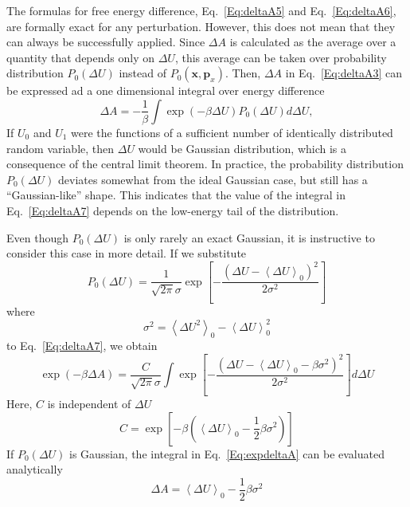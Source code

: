 The formulas for free energy difference, Eq.~\ref{Eq:deltaA5} and Eq.~\ref{Eq:deltaA6}, are formally exact for any perturbation. However, this does not mean that they can always be successfully applied. Since $\Delta A$ is calculated as the average over a quantity that depends only on $\Delta U$, this average can be taken over probability distribution $P_0(\Delta U)$ instead of $P_{0}(\textbf{x},\textbf{p}_{x})$. Then, $\Delta A$ in Eq.~\ref{Eq:deltaA3} can be expressed ad a one dimensional integral over energy difference
\begin{equation}
\Delta A = -\frac{1}{\beta} \int \exp(-\beta \Delta U) P_{0}(\Delta U) d\Delta U,
\label{Eq:deltaA7}
\end{equation}
If $U_{0}$ and $U_{1}$ were the functions of a sufficient number of identically distributed random variable, then $\Delta U$ would be Gaussian distribution, which is a consequence of the central limit theorem. In practice, the probability distribution $P_{0}(\Delta U)$ deviates somewhat from the ideal Gaussian case, but still has a ``Gaussian-like'' shape. This indicates that the value of the integral in Eq.~\ref{Eq:deltaA7} depends on the low-energy tail of the distribution.

Even though $P_{0}(\Delta U)$ is only rarely an exact Gaussian, it is instructive to consider this case in more detail. If we substitute
\begin{equation}
P_{0}(\Delta U) = \frac{1}{\sqrt{2\pi}\sigma}\exp[-\frac{(\Delta U - \left \langle \Delta U \right \rangle_{0})^2}{2\sigma^2}]
\label{Eq:gaussian}
\end{equation}
where
\begin{equation}
\sigma^2 = \left \langle \Delta U^2 \right \rangle_{0} - \left \langle \Delta U \right \rangle_{0}^2
\label{Eq:variance}
\end{equation}
to Eq.~\ref{Eq:deltaA7}, we obtain
\begin{equation}
\exp(-\beta \Delta A) = \frac{C}{\sqrt{2\pi}\sigma} \int \exp[-\frac{(\Delta U - \left \langle \Delta U \right \rangle_{0} - \beta \sigma ^2)^2}{2\sigma^2}] d\Delta U
\label{Eq:expdeltaA}
\end{equation}
Here, $C$ is independent of $\Delta U$
\begin{equation}
C = \exp [-\beta (\left \langle \Delta U \right \rangle_{0} - \frac{1}{2} \beta \sigma ^2)]
\label{Eq:C}
\end{equation}
If $P_{0}(\Delta U)$ is Gaussian, the integral in Eq.~\ref{Eq:expdeltaA} can be evaluated analytically
\begin{equation}
\Delta A = \left \langle \Delta U \right \rangle_{0} - \frac{1}{2} \beta \sigma ^2
\label{Eq:deltaA8}
\end{equation}
